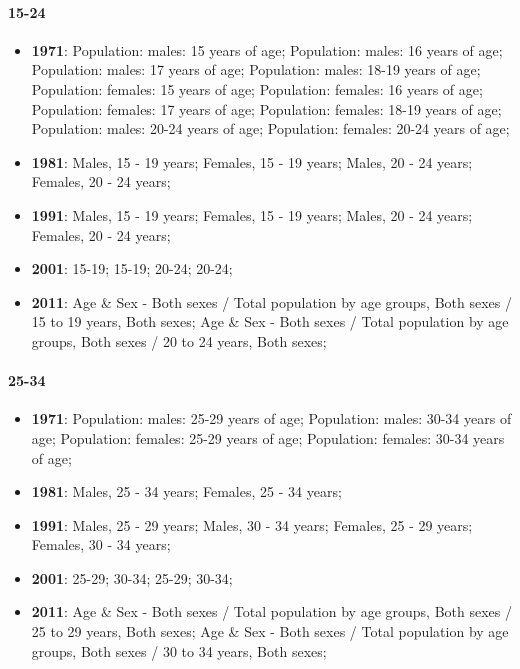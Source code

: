\documentclass[a4paper]{article}
\begin{document}
\paragraph{15-24}
\begin{itemize}
   \item{\textbf{1971}:  Population: males: 15 years of age; Population: males: 16 years of age; Population: males: 17 years of age; Population: males: 18-19 years of age; Population: females: 15 years of age; Population: females: 16 years of age; Population: females: 17 years of age; Population: females: 18-19 years of age; Population: males: 20-24 years of age; Population: females: 20-24 years of age;}
   \item{\textbf{1981}:  Males, 15 - 19 years; Females, 15 - 19 years; Males, 20 - 24 years; Females, 20 - 24 years;}
   \item{\textbf{1991}:  Males, 15 - 19 years; Females, 15 - 19 years; Males, 20 - 24 years; Females, 20 - 24 years;}
   \item{\textbf{2001}:  15-19; 15-19; 20-24; 20-24;}
   \item{\textbf{2011}:  Age \& Sex - Both sexes / Total population by age groups, Both sexes / 15 to 19 years, Both sexes; Age \& Sex - Both sexes / Total population by age groups, Both sexes / 20 to 24 years, Both sexes;}
\end{itemize}

\paragraph{25-34}
\begin{itemize}
   \item{\textbf{1971}:  Population: males: 25-29 years of age; Population: males: 30-34 years of age; Population: females: 25-29 years of age; Population: females: 30-34 years of age;}
   \item{\textbf{1981}:  Males, 25 - 34 years; Females, 25 - 34 years;}
   \item{\textbf{1991}:  Males, 25 - 29 years; Males, 30 - 34 years; Females, 25 - 29 years; Females, 30 - 34 years;}
   \item{\textbf{2001}:  25-29; 30-34; 25-29; 30-34;}
   \item{\textbf{2011}:  Age \& Sex - Both sexes / Total population by age groups, Both sexes / 25 to 29 years, Both sexes; Age \& Sex - Both sexes / Total population by age groups, Both sexes / 30 to 34 years, Both sexes;}
\end{itemize}
\end{document}
